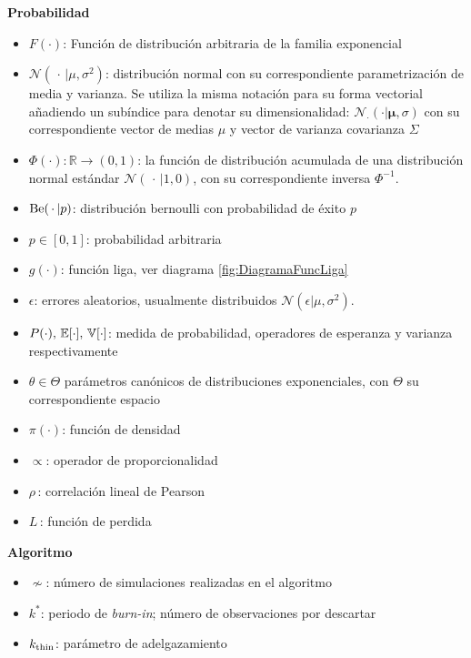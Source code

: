 \documentclass[../../Main/Main.tex]{subfiles}
\begin{document}
\textbf{Probabilidad}
\begin{itemize}[label={}]
	\item $F(\cdot)$: Función de distribución arbitraria de la familia exponencial
	\item $\mathcal{N}(\,\cdot\,|\mu,\sigma^2)$: distribución normal con su correspondiente parametrización de media y varianza. Se utiliza la misma notación para su forma vectorial añadiendo un subíndice para denotar su dimensionalidad: $\mathcal{N}_{\cdot}(\cdot|\bm{\mu},\sigma)$ con su correspondiente vector de medias $\mu$ y vector de varianza covarianza $\Sigma$
	\item $\Phi(\cdot):\mathbb{R}\rightarrow(0,1)$: la función de distribución acumulada de una distribución normal estándar $\mathcal{N}(\,\cdot\,| 1,0)$, con su correspondiente inversa $\Phi^{-1}$.
	\item $\text{Be}(\,\cdot\,|p)$: distribución bernoulli con probabilidad de éxito $p$
	\item $p \in [0,1]$: probabilidad arbitraria
	\item $g(\cdot)$: función liga, ver diagrama \ref{fig:DiagramaFuncLiga}
	\item $\epsilon$: errores aleatorios, usualmente distribuidos $\mathcal{N}(\epsilon|\mu,\sigma^2)$.
	\item $P(\cdot),\, \mathbb{E}[\cdot],\, \mathbb{V}[\cdot]$: medida de probabilidad, operadores de esperanza y varianza respectivamente
	\item $\theta \in \Theta$ parámetros canónicos de distribuciones exponenciales, con $\Theta$ su correspondiente espacio
	\item $\pi(\cdot)$: función de densidad
	\item $\propto$: operador de proporcionalidad
	\item $\rho\,$: correlación lineal de Pearson
	\item $L\,$: función de perdida
\end{itemize}
	
\textbf{Algoritmo}
\begin{itemize}[label={}]
	\item $\nsim$: número de simulaciones realizadas en el algoritmo
	\item $k^*$:  periodo de \textit{burn-in}; número de observaciones por descartar
	\item $k_{\text{thin}}$: parámetro de adelgazamiento 
\end{itemize}
\end{document}

